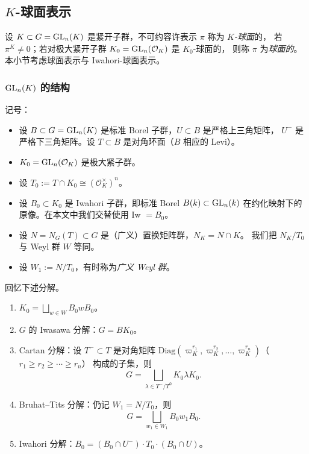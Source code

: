 \subsection{$K$-球面表示}

设 $K\subset G=\mathrm{GL}_n(K)$ 是紧开子群，不可约容许表示 $\pi$ 称为 \emph{$K$-球面}的，
若 $\pi^{K}\neq 0$；若对极大紧开子群 $K_0=\mathrm{GL}_n(\mathcal{O}_K)$ 是 $K_0$-球面的，
则称 $\pi$ 为\emph{球面的}。本小节考虑球面表示与 Iwahori-球面表示。

\subsubsection{$\mathrm{GL}_n(K)$ 的结构}

记号：
\begin{itemize}[leftmargin=1.6em]
\item 设 $B\subset G=\mathrm{GL}_n(K)$ 是标准 Borel 子群，$U\subset B$ 是严格上三角矩阵，
      $U^{-}$ 是严格下三角矩阵。设 $T\subset B$ 是对角环面（$B$ 相应的 Levi）。
\item $K_0=\mathrm{GL}_n(\mathcal{O}_K)$ 是极大紧子群。
\item 设 $T_0:=T\cap K_0\cong(\mathcal{O}_K^{\times})^{n}$。
\item 设 $B_0\subset K_0$ 是 Iwahori 子群，即标准 Borel $B(k)\subset\mathrm{GL}_n(k)$
      在约化映射下的原像。在本文中我们交替使用 Iw $=B_0$。
\item 设 $N=N_G(T)\subset G$ 是（广义）置换矩阵群，$N_K=N\cap K$。
      我们把 $N_K/T_0$ 与 Weyl 群 $W$ 等同。
\item 设 $W_1:=N/T_0$，有时称为\emph{广义 Weyl 群}。
\end{itemize}

回忆下述分解。

\begin{lemma}
\leavevmode
\begin{enumerate}[label=(\arabic*),leftmargin=2.2em]
\item $\displaystyle K_0=\bigsqcup_{w\in W}B_0wB_0$。
\item $G$ 的 Iwasawa 分解：$G=BK_0$。
\item Cartan 分解：设 $T^{-}\subset T$ 是对角矩阵
      $\mathrm{Diag}(\varpi_K^{r_1},\varpi_K^{r_2},\dots,\varpi_K^{r_n})$（$r_1\ge r_2\ge\cdots\ge r_n$）
      构成的子集，则
\[
G=\bigsqcup_{\lambda\in T^{-}/T^{0}}K_0\lambda K_0 .
\]
\item Bruhat--Tits 分解：仍记 $W_1=N/T_0$，则
\[
G=\bigsqcup_{w_1\in W_1}B_0w_1B_0 .
\]
\item Iwahori 分解：$B_0=(B_0\cap U^{-})\cdot T_0\cdot(B_0\cap U)$。
\end{enumerate}
\end{lemma}

